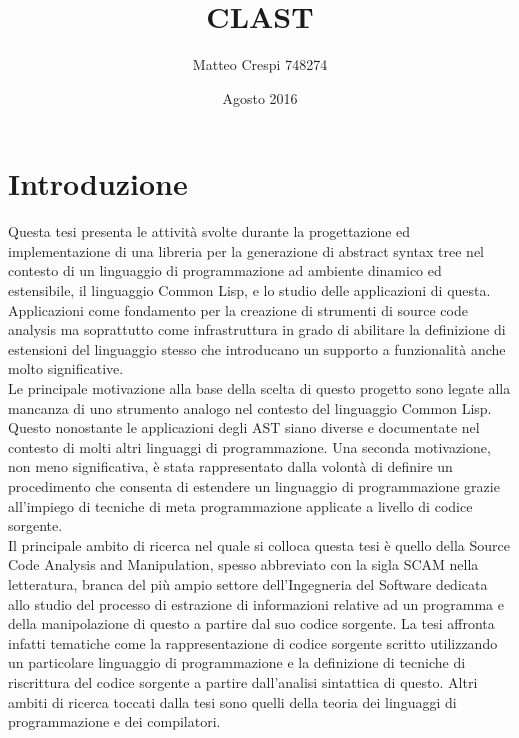 \documentclass{book}
\title{CLAST}
\author{Matteo Crespi 748274}
\date{Agosto 2016}
\begin{document}
\maketitle

\pagestyle{plain}

\newpage

\tableofcontents
\listoffigures
\lstlistoflistings

\cleardoublepage

\pagestyle{headings}

\chapter{Introduzione}

Questa tesi presenta le attività svolte durante la progettazione ed
implementazione di una libreria per la generazione di abstract syntax tree nel
contesto di un linguaggio di programmazione ad ambiente dinamico ed estensibile,
il linguaggio Common Lisp, e lo studio delle applicazioni di questa.
Applicazioni come fondamento per la creazione di strumenti di source code
analysis ma soprattutto come infrastruttura in grado di abilitare la definizione
di estensioni del linguaggio stesso che introducano un supporto a funzionalità
anche molto significative.\\

Le principale motivazione alla base della scelta di questo progetto sono legate
alla mancanza di uno strumento analogo nel contesto del linguaggio Common Lisp.
Questo nonostante le applicazioni degli AST siano diverse e documentate nel
contesto di molti altri linguaggi di programmazione. Una seconda motivazione,
non meno significativa, è stata rappresentato dalla volontà di definire un
procedimento che consenta di estendere un linguaggio di programmazione grazie
all’impiego di tecniche di meta programmazione applicate a livello di codice
sorgente.\\

Il principale ambito di ricerca nel quale si colloca questa tesi è quello della
Source Code Analysis and Manipulation, spesso abbreviato con la sigla SCAM nella
letteratura, branca del più ampio settore dell’Ingegneria del Software dedicata
allo studio del processo di estrazione di informazioni relative ad un programma
e della manipolazione di questo a partire dal suo codice sorgente. La tesi
affronta infatti tematiche come la rappresentazione di codice sorgente scritto
utilizzando un particolare linguaggio di programmazione e la definizione di
tecniche di riscrittura del codice sorgente a partire dall’analisi sintattica di
questo. Altri ambiti di ricerca toccati dalla tesi sono quelli della teoria dei
linguaggi di programmazione e dei compilatori.\\
\end{document}
